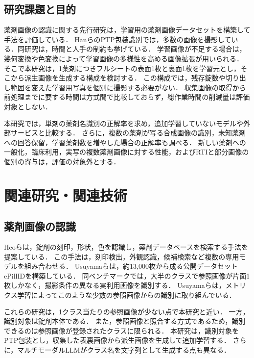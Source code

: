 \documentclass[uplatex,dvipdfmx]{jsarticle}
\begin{document}
\subsection{研究課題と目的}

薬剤画像の認識に関する先行研究は，学習用の薬剤画像データセットを構築して手法を評価している\cite{heo2023pill,usuyama2020epillid}．
HanらのPTP包装識別では，多数の画像を撮影している．同研究は，時間と人手の制約も挙げている\cite{han2021blister}．
学習画像が不足する場合は，幾何変換や色変換によって学習画像の多様性を高める画像拡張が用いられる\cite{shorten2019augmentation}．
そこで本研究は，1薬剤につきフルシートの表面1枚と裏面1枚を学習元とし，そこから派生画像を生成する構成を検討する．
この構成では，残存錠数や切り出し範囲を変えた学習用写真を個別に撮影する必要がない．
収集画像の取得から前処理までに要する時間は方式間で比較しておらず，総作業時間の削減量は評価対象としない．

本研究では，単剤の薬剤名識別の正解率を求め，追加学習していないモデルや外部サービスと比較する．
さらに，複数の薬剤が写る合成画像の識別，未知薬剤への回答保留，学習薬剤数を増やした場合の正解率も調べる．
新しい薬剤への一般化，臨床利用，実写の複数薬剤画像に対する性能，およびRTIと部分画像の個別の寄与は，評価の対象外とする．

\clearpage
\section{関連研究・関連技術}\label{sec:related}

\subsection{薬剤画像の認識}

Heoらは，錠剤の刻印，形状，色を認識し，薬剤データベースを検索する手法を提案している\cite{heo2023pill}．
この手法は，刻印検出，外観認識，候補検索など複数の専用モデルを組み合わせる．
Usuyamaらは，約13,000枚から成る公開データセットePillIDを構築している\cite{usuyama2020epillid}．
同ベンチマークでは，大半のクラスで参照画像が片面1枚しかなく，撮影条件の異なる実利用画像を識別する．
Usuyamaらは，メトリクス学習によってこのような少数の参照画像からの識別に取り組んでいる．

これらの研究は，1クラス当たりの参照画像が少ない点で本研究と近い．
一方，識別対象は錠剤本体である．
また，参照画像と照合する方式であるため，識別できるのは参照画像が登録されたクラスに限られる．
本研究は，識別対象をPTP包装とし，収集した表裏画像から派生画像を生成して追加学習する．
さらに，マルチモーダルLLMがクラス名を文字列として生成する点も異なる．
\end{document}
